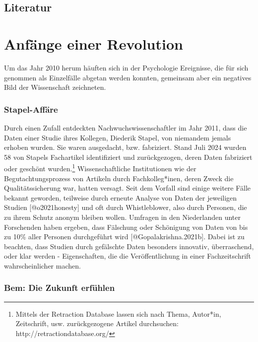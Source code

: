 \documentclass[
  letterpaper,
  DIV=11,
  numbers=noendperiod]{scrreprt}
\begin{document}
\section*{Literatur}\label{literatur-1}


\chapter{Anfänge einer Revolution}\label{anfuxe4nge-einer-revolution}

Um das Jahr 2010 herum häuften sich in der Psychologie Ereignisse, die
für sich genommen als Einzelfälle abgetan werden konnten, gemeinsam aber
ein negatives Bild der Wissenschaft zeichneten.

\subsection{Stapel-Affäre}\label{stapel-affuxe4re}

Durch einen Zufall entdeckten Nachwuchswissenschaftler im Jahr 2011,
dass die Daten einer Studie ihres Kollegen, Diederik Stapel, von
niemandem jemals erhoben wurden. Sie waren ausgedacht, bzw. fabriziert.
Stand Juli 2024 wurden 58 von Stapels Fachartikel identifiziert und
zurückgezogen, deren Daten fabriziert oder geschönt wurden.\footnote{Mittels
  der Retraction Database lassen sich nach Thema, Autor*in, Zeitschrift,
  usw. zurückgezogene Artikel durchsuchen:
  http://retractiondatabase.org/} Wissenschaftliche Institutionen wie
der Begutachtungsprozess von Artikeln durch Fachkolleg*inen, deren Zweck
die Qualitätssicherung war, hatten versagt. Seit dem Vorfall sind einige
weitere Fälle bekannt geworden, teilweise durch erneute Analyse von
Daten der jeweiligen Studien {[}@o2021honesty{]} und oft durch
Whistleblower, also durch Personen, die zu ihrem Schutz anonym bleiben
wollen. Umfragen in den Niederlanden unter Forschenden haben ergeben,
dass Fälschung oder Schönigung von Daten von bis zu 10\% aller Personen
durchgeführt wird {[}@Gopalakrishna.2021b{]}. Dabei ist zu beachten,
dass Studien durch gefälschte Daten besonders innovativ, überraschend,
oder klar werden - Eigenschaften, die die Veröffentlichung in einer
Fachzeitschrift wahrscheinlicher machen.

\subsection{Bem: Die Zukunft
erfühlen}\label{bem-die-zukunft-erfuxfchlen}
\end{document}
